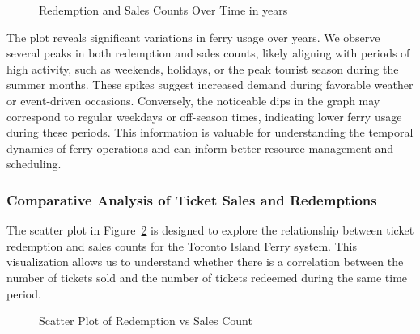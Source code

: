 \documentclass[
  letterpaper,
  DIV=11,
  numbers=noendperiod]{scrartcl}
\begin{document}
\begin{figure}[H]


\caption{\label{fig-linePlot4}Redemption and Sales Counts Over Time in
years}

\end{figure}%

The plot reveals significant variations in ferry usage over years. We
observe several peaks in both redemption and sales counts, likely
aligning with periods of high activity, such as weekends, holidays, or
the peak tourist season during the summer months. These spikes suggest
increased demand during favorable weather or event-driven occasions.
Conversely, the noticeable dips in the graph may correspond to regular
weekdays or off-season times, indicating lower ferry usage during these
periods. This information is valuable for understanding the temporal
dynamics of ferry operations and can inform better resource management
and scheduling.

\subsubsection{Comparative Analysis of Ticket Sales and
Redemptions}\label{comparative-analysis-of-ticket-sales-and-redemptions}

The scatter plot in Figure~\ref{fig-scatterPlot} is designed to explore
the relationship between ticket redemption and sales counts for the
Toronto Island Ferry system. This visualization allows us to understand
whether there is a correlation between the number of tickets sold and
the number of tickets redeemed during the same time period.

\begin{figure}


\caption{\label{fig-scatterPlot}Scatter Plot of Redemption vs Sales
Count}

\end{figure}%
\end{document}
